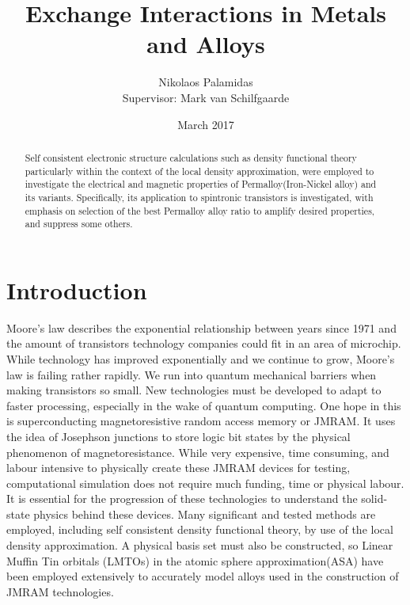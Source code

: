 \documentclass[%
 reprint,
 amsmath,amssymb,
 aps,
]{revtex4-1}
\begin{document}

\title{Exchange Interactions in Metals and Alloys}%

\author{Nikolaos Palamidas\\Supervisor: Mark van Schilfgaarde}

\date{March 2017}
\begin{abstract}
Self consistent electronic structure calculations such as density functional theory particularly within the context of the local density approximation, were employed to investigate the electrical and magnetic properties of Permalloy(Iron-Nickel alloy) and its variants. Specifically, its application to spintronic transistors is investigated, with emphasis on selection of the best Permalloy alloy ratio to amplify desired properties, and suppress some others.

\end{abstract}

\maketitle


\section{\label{sec:level1}Introduction}

Moore's law describes the exponential relationship between years since 1971 and the amount of transistors technology companies could fit in an area of microchip. While technology has improved exponentially and we continue to grow, Moore's law is failing rather rapidly. We run into quantum mechanical barriers when making transistors so small. New technologies must be developed to adapt to faster processing, especially in the wake of quantum computing. One hope in this is superconducting magnetoresistive random access memory or JMRAM. It uses the idea of Josephson junctions to store logic bit states by the physical phenomenon of magnetoresistance. While very expensive, time consuming, and labour intensive to physically create these JMRAM devices for testing, computational simulation does not require much funding, time or physical labour. It is essential for the progression of these technologies to understand the solid-state physics behind these devices. Many significant and tested methods are employed, including self consistent density functional theory\cite{inhom}, by use of the local density approximation. A physical basis set must also be constructed, so Linear Muffin Tin orbitals (LMTOs) \cite{andersen} in the atomic sphere approximation(ASA) \cite{gunn} have been employed extensively to accurately model alloys used in the construction of JMRAM technologies.
\end{document}
